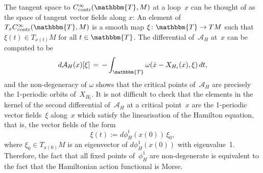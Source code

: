 \documentclass[12pt,twoside]{amsart}
\theoremstyle{plain}
\numberwithin{figure}{section}
\numberwithin{equation}{section}
\def\ca{{\mathcal A}}
\def\TT{\mathbbm{T}}
\begin{document}
The tangent space to $C^\infty_{\mathrm{contr}}(\TT,M)$ at a loop~$x$ can be thought of as 
the space of tangent vector fields along $x$: An element of $T_x C^\infty_{\mathrm{contr}}(\TT,M)$ is a smooth map $\xi \colon \TT \rightarrow TM$ such that $\xi (t)\in T_{x(t)} M$ for all $t \in \TT$. 
The differential of~$\ca_H$ at~$x$ can be computed to be
\begin{equation}
\label{diff}
d\ca_H(x)[\xi] \,=\, - \int_{\TT} \omega( \dot{x} - X_{H_t}(x),\xi )\, dt,
\end{equation}
and the non-degeneracy of $\omega$ shows that the critical points of~$\ca_H$ are precisely the 1-periodic orbits of~$X_{H_t}$. It is not difficult to check that the elements in the kernel of the second differential of~$\ca_H$ at a critical point~$x$ are the 1-periodic vector fields~$\xi$ along~$x$ which satisfy the linearisation of the Hamilton equation, that is, the vector fields of the form
\[
\xi(t) := d\phi_H^t(x(0)) \,\xi_0,
\]
where $\xi_0 \in T_{x(0)}M$ is an eigenvector of $d\phi_H^1(x(0))$ with eigenvalue~1. 
Therefore, the fact that all fixed points of~$\phi_H^1$ are non-degenerate 
is equivalent to the fact that the Hamiltonian action functional is Morse.
\end{document}
